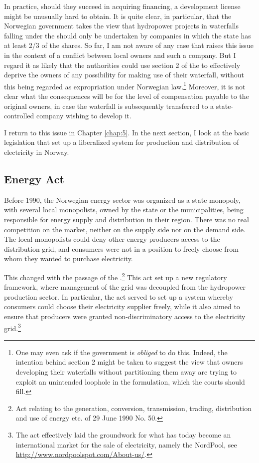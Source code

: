 In practice, should they succeed in acquiring financing, a development license might be unusually hard to obtain. It is quite clear, in particular, that the Norwegian government takes the view that hydropower projects in waterfalls falling under the \cite{ica17} should only be undertaken by companies in which the state has at least 2/3 of the shares. So far, I am not aware of any case that raises this issue in the context of a conflict between local owners and such a company. But I regard it as likely that the authorities could use section 2 of the \cite{ica17} to effectively deprive the owners of any possibility for making use of their waterfall, without this being regarded as expropriation under Norwegian law.\footnote{One may even ask if the government is {\it obliged} to do this. Indeed, the intention behind section 2 might be taken to suggest the view that owners developing their waterfalls without partitioning them away are trying to exploit an unintended loophole in the formulation, which the courts should fill.} Moreover, it is not clear what the consequences will be for the level of compensation payable to the original owners, in case the waterfall is subsequently transferred to a state-controlled company wishing to develop it. 

I return to this issue in Chapter \ref{chap:5}. In the next section, I look at the basic legislation that set up a liberalized system for production and distribution of electricity in Norway.

\subsection{Energy Act}\label{sec:ea}

Before 1990, the Norwegian energy sector was organized as a state monopoly, with several local monopolists, owned by the state or the municipalities, being responsible for energy supply and distribution in their region. There was no real competition on the market, neither on the supply side nor on the demand side. The local monopolists could deny other energy producers access to the distribution grid, and consumers were not in a position to freely choose from whom they wanted to purchase electricity.

This changed with the passage of the \cite{ea90}.\footnote{Act relating to the generation, conversion, transmission, trading, distribution and use of energy etc. of 29 June 1990 No. 50.} This act set up a new regulatory framework, where management of the grid was decoupled from the hydropower production sector. In particular, the act served to set up a system whereby consumers could choose their electricity supplier freely, while it also aimed to ensure that producers were granted non-discriminatory access to the electricity grid.\footnote{The act effectively laid the groundwork for what has today become an international market for the sale of electricity, namely the NordPool, see \url{http://www.nordpoolspot.com/About-us/}.}

